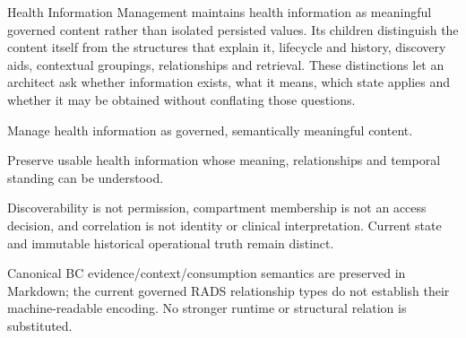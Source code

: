 Health Information Management maintains health information as meaningful governed content rather than isolated persisted values. Its children distinguish the content itself from the structures that explain it, lifecycle and history, discovery aids, contextual groupings, relationships and retrieval. These distinctions let an architect ask whether information exists, what it means, which state applies and whether it may be obtained without conflating those questions.



Manage health information as governed, semantically meaningful content.



Preserve usable health information whose meaning, relationships and temporal standing can be understood.



Discoverability is not permission, compartment membership is not an access decision, and correlation is not identity or clinical interpretation. Current state and immutable historical operational truth remain distinct.



Canonical BC evidence/\allowbreak{}context/\allowbreak{}consumption semantics are preserved in Markdown; the current governed RADS relationship types do not establish their machine-readable encoding. No stronger runtime or structural relation is substituted.


